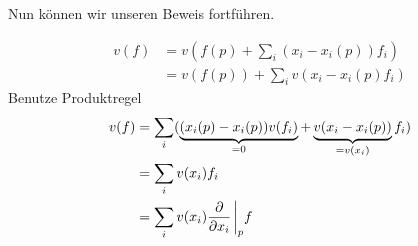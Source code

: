 Nun können wir unseren Beweis fortführen.

\begin{bew} \leavevmode
\begin{align}
v(f) &= v(f(p) + \sum_i (x_i - x_i(p)) f_i) \\
&= v(f(p)) + \sum_i v(x_i - x_i (p) f_i)
\end{align}
Benutze Produktregel
\begin{align}
v(f) &= \sum_i (\underbrace{(x_i (p) - x_i (p)) v(f_i)}_{=0} + \underbrace{v(x_i - x_i (p))}_{=v(x_i)} f_i) \\
&= \sum_i v(x_i) f_i \\
&= \sum_i v(x_i) \pdv{x_i} \eval_p f 
\end{align}
\end{bew}

